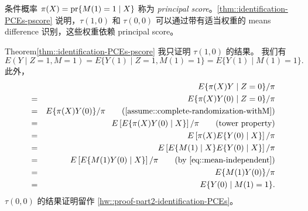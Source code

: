 条件概率 $\pi(X)=\textup{pr}\{M(1)=1\mid X\}$ 称为 {\it principal score}。\cref{thm::identification-PCEs-pscore} 说明，$\tau(1,0)$ 和 $\tau(0,0)$ 可以通过带有适当权重的 means difference 识别，这些权重依赖 principal score。



 \begin{myproof}{Theorem}{\cref{thm::identification-PCEs-pscore}}
 我只证明 $\tau(1,0)$ 的结果。
我们有
 $$
 E(Y\mid Z=1, M=1)  = E\{ Y(1) \mid Z=1, M(1) = 1 \} =  E\{ Y(1) \mid   M(1) = 1 \} .
 $$
此外，
 \begin{eqnarray*}
&& E  \{\pi(X) Y\mid Z=0   \}  /\pi  \\
 &=& E  \{\pi(X) Y(0)  \mid Z=0 \}  /\pi  \\
 &=&  E  \{\pi(X) Y(0)   \}  /\pi \qquad   (\text{\cref{assume::complete-randomization-withM}}) \\
 &=&  E \left[    E\{\pi(X) Y(0) \mid X  \} \right]/\pi  \qquad (\text{tower property}) \\ 
 &=& E \left[  \pi(X)  E\{ Y(0) \mid X  \} \right]/\pi  \\ 
 &=& E \left[  E\{    M(1) \mid X\} E\{ Y(0) \mid X  \} \right]/\pi \\
 &=&  E \left[  E\{    M(1)  Y(0) \mid X  \} \right]/\pi  \qquad  (\text{by \cref{eq::mean-independent}}) \\
 &=&  E\{    M(1) Y(0)  \}/\pi   \\
 &=&  E\{ Y(0) \mid M(1) = 1 \}  .
 \end{eqnarray*}
% 
$\tau(0,0)$ 的结果证明留作 \cref{hw::proof-part2-identification-PCEs}。
 \end{myproof}

